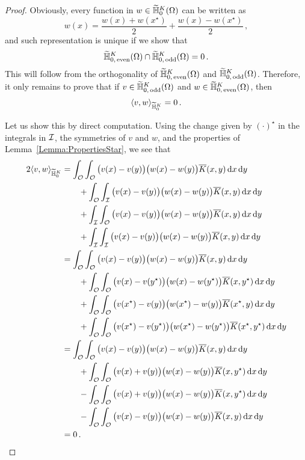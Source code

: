 \begin{proof}
	Obviously, every function in $w \in \widetilde{\mathbb{H}}^K_0(\Omega)$ can be written as
	$$
	w(x) = \dfrac{w(x) + w(x^\star)}{2} + \dfrac{w(x) - w(x^\star)}{2}\,,
	$$
	and such representation is unique if we show that 
	$$
	\widetilde{\mathbb{H}}^K_{0,\, \mathrm{even}}(\Omega) \cap \widetilde{\mathbb{H}}^K_{0,\,\mathrm{odd}}(\Omega)  = 0\,.
	$$
	This will follow from the orthogonality of $\widetilde{\mathbb{H}}^K_{0,\, \mathrm{even}}(\Omega) $ and $\widetilde{\mathbb{H}}^K_{0,\,\mathrm{odd}}(\Omega)$. Therefore, it only remains to prove that if $v \in \widetilde{\mathbb{H}}^K_{0,\,\mathrm{odd}}(\Omega)$ and $w \in \widetilde{\mathbb{H}}^K_{0,\, \mathrm{even}}(\Omega)$, then
	$$
	\langle v,w \rangle_{\widetilde{\mathbb{H}}^K_0} = 0\,.
	$$
	
	Let us show this by direct computation. Using the change given by $(\cdot)^\star$ in the integrals in $\mathcal{I}$, the symmetries of $v$ and $w$, and the properties of Lemma~\ref{Lemma:PropertiesStar}, we see that
    \begin{align*}
    2\langle v,w \rangle_{\widetilde{\mathbb{H}}^K_0} &=  
    \int_{\mathcal{O}} \int_{\mathcal{O}}  \big(v(x) - v(y)\big)\big(w(x) - w(y)\big) \overline{K} (x,y) \,\mathrm{d} x \,\mathrm{d} y \\
    &\quad \quad + \int_{\mathcal{O}} \int_{\mathcal{I}}  \big(v(x) - v(y)\big)\big(w(x) - w(y)\big) \overline{K} (x,y) \,\mathrm{d} x \,\mathrm{d} y \\
    & \quad \quad + \int_{\mathcal{I}} \int_{\mathcal{O}}   \big(v(x) - v(y)\big)\big(w(x) - w(y)\big) \overline{K} (x,y) \,\mathrm{d} x \,\mathrm{d} y \\
    &\quad \quad  + \int_{\mathcal{I}} \int_{\mathcal{I}}  \big(v(x) - v(y)\big)\big(w(x) - w(y)\big) \overline{K} (x,y) \,\mathrm{d} x \,\mathrm{d} y \\
    &= \int_{\mathcal{O}} \int_{\mathcal{O}}  \big(v(x) - v(y)\big)\big(w(x) - w(y)\big) \overline{K} (x,y) \,\mathrm{d} x \,\mathrm{d} y \\
    &\quad \quad + \int_{\mathcal{O}} \int_{\mathcal{O}}  \big(v(x) - v(y^\star)\big)\big(w(x) - w(y^\star)\big) \overline{K} (x,y^\star) \,\mathrm{d} x \,\mathrm{d} y \\
    & \quad \quad + \int_{\mathcal{O}} \int_{\mathcal{O}}   \big(v(x^\star) - v(y)\big)\big(w(x^\star) - w(y)\big) \overline{K} (x^\star,y) \,\mathrm{d} x \,\mathrm{d} y \\
    &\quad \quad  + \int_{\mathcal{O}} \int_{\mathcal{O}}  \big(v(x^\star) - v(y^\star)\big)\big(w(x^\star) - w(y^\star)\big) \overline{K} (x^\star,y^\star) \,\mathrm{d} x \,\mathrm{d} y \\
   &= \int_{\mathcal{O}} \int_{\mathcal{O}}  \big(v(x) - v(y)\big)\big(w(x) - w(y)\big) \overline{K} (x,y) \,\mathrm{d} x \,\mathrm{d} y \\
    &\quad \quad + \int_{\mathcal{O}} \int_{\mathcal{O}}  \big(v(x) + v(y)\big)\big(w(x) - w(y)\big) \overline{K} (x,y^\star) \,\mathrm{d} x \,\mathrm{d} y \\
    & \quad \quad - \int_{\mathcal{O}} \int_{\mathcal{O}}   \big(v(x) + v(y)\big)\big(w(x) - w(y)\big) \overline{K} (x,y^\star) \,\mathrm{d} x \,\mathrm{d} y \\
    &\quad \quad  - \int_{\mathcal{O}} \int_{\mathcal{O}}  \big(v(x) - v(y)\big)\big(w(x) - w(y)\big) \overline{K} (x,y) \,\mathrm{d} x \,\mathrm{d} y \\
    &= 0\,.
    \end{align*}
\end{proof}


